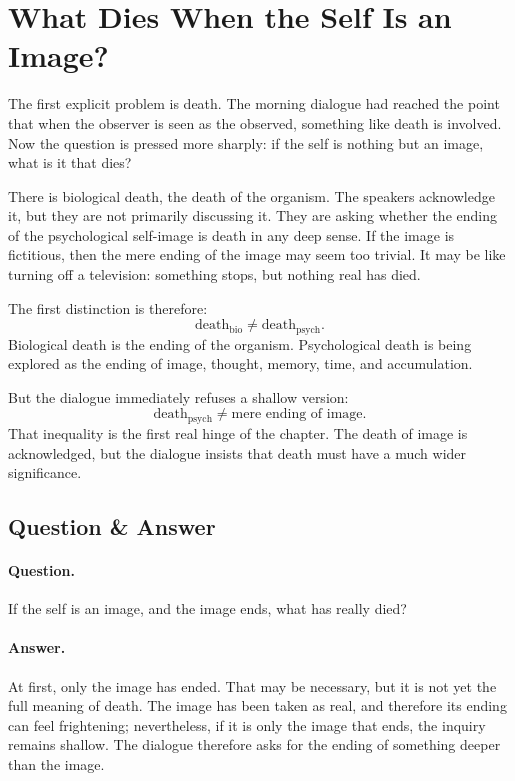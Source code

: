 \section{What Dies When the Self Is an Image?}

The first explicit problem is death. The morning dialogue had reached the point that when the observer is seen as the observed, something like death is involved. Now the question is pressed more sharply: if the self is nothing but an image, what is it that dies?

There is biological death, the death of the organism. The speakers acknowledge it, but they are not primarily discussing it. They are asking whether the ending of the psychological self-image is death in any deep sense. If the image is fictitious, then the mere ending of the image may seem too trivial. It may be like turning off a television: something stops, but nothing real has died.

The first distinction is therefore:
\begin{equation}
\text{death}_{\mathrm{bio}}
\neq
\text{death}_{\mathrm{psych}}.
\end{equation}
Biological death is the ending of the organism. Psychological death is being explored as the ending of image, thought, memory, time, and accumulation.

But the dialogue immediately refuses a shallow version:
\begin{equation}
\text{death}_{\mathrm{psych}}
\neq
\text{mere ending of image}.
\end{equation}
That inequality is the first real hinge of the chapter. The death of image is acknowledged, but the dialogue insists that death must have a much wider significance.

\subsection{Question \& Answer}

\paragraph{Question.}
If the self is an image, and the image ends, what has really died?

\paragraph{Answer.}
At first, only the image has ended. That may be necessary, but it is not yet the full meaning of death. The image has been taken as real, and therefore its ending can feel frightening; nevertheless, if it is only the image that ends, the inquiry remains shallow. The dialogue therefore asks for the ending of something deeper than the image.

